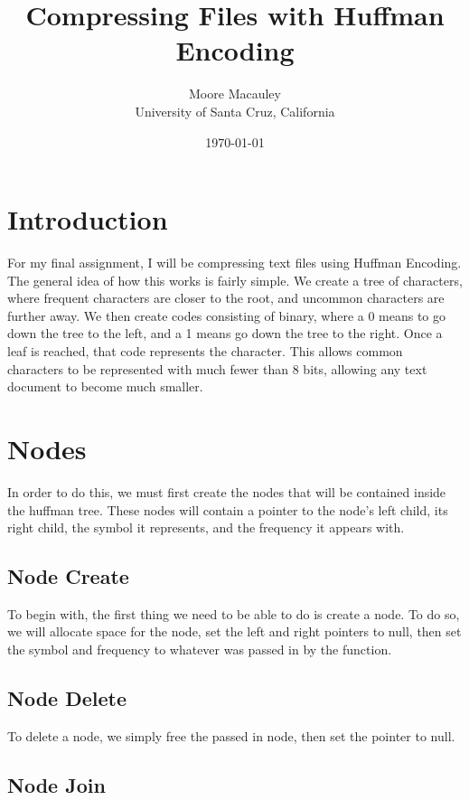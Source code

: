 \documentclass[11pt]{article}
\title{Compressing Files with Huffman Encoding}
\author{Moore Macauley \\ University of Santa Cruz, California}
\date{\today}
\begin{document}
\maketitle

\section{Introduction}

For my final assignment, I will be compressing text files using Huffman Encoding. The general idea of how this works is fairly simple. We create a tree of characters, where frequent characters are closer to the root, and uncommon characters are further away. We then create codes consisting of binary, where a 0 means to go down the tree to the left, and a 1 means go down the tree to the right. Once a leaf is reached, that code represents the character. This allows common characters to be represented with much fewer than 8 bits, allowing any text document to become much smaller.

\section{Nodes}

In order to do this, we must first create the nodes that will be contained inside the huffman tree. These nodes will contain a pointer to the node's left child, its right child, the symbol it represents, and the frequency it appears with.

\subsection{Node Create}

To begin with, the first thing we need to be able to do is create a node. To do so, we will allocate space for the node, set the left and right pointers to null, then set the symbol and frequency to whatever was passed in by the function.

\subsection{Node Delete}

To delete a node, we simply free the passed in node, then set the pointer to null.

\subsection{Node Join}
\end{document}
